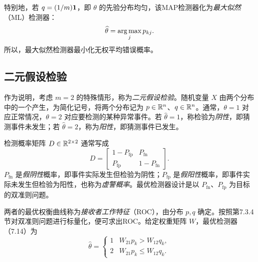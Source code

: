 特别地，若 $q=(1/m)\mathbf 1$，即 $\theta$ 的先验分布均匀，该MAP检测器化为\emph{最大似然}（ML）检测器：
\[
 \widehat\theta=\operatorname*{arg\,max}_jp_{kj}.
\]
所以，最大似然检测器最小化无权平均错误概率。

\subsection{二元假设检验}
作为说明，考虑 $m=2$ 的特殊情形，称为\emph{二元假设检验}。随机变量 $X$ 由两个分布中的一个产生，为简化记号，将两个分布记为 $p\in\mathbb R^n$、$q\in\mathbb R^n$。通常，$\theta=1$ 对应正常情况，$\theta=2$ 对应要检测的某种异常事件。若 $\widehat\theta=1$，称检验为\emph{阴性}，即猜测事件未发生；若 $\widehat\theta=2$，称为\emph{阳性}，即猜测事件已发生。

检测概率矩阵 $D\in\mathbb R^{2\times2}$ 通常写成
\[
 D=\begin{bmatrix}1-P_{\mathrm{fp}}&P_{\mathrm{fn}}\\
 P_{\mathrm{fp}}&1-P_{\mathrm{fn}}\end{bmatrix}.
\]
$P_{\mathrm{fn}}$ 是\emph{假阴性}概率，即事件实际发生但检验为阴性；$P_{\mathrm{fp}}$ 是\emph{假阳性}概率，即事件实际未发生但检验为阳性，也称为\emph{虚警概率}。最优检测器设计是以 $P_{\mathrm{fn}}$、$P_{\mathrm{fp}}$ 为目标的双准则问题。

两者的最优权衡曲线称为\emph{接收者工作特征}（ROC），由分布 $p,q$ 确定。按照第7.3.4节对双准则问题进行标量化，便可求出ROC。给定权重矩阵 $W$，最优检测器（7.14）为
\[
 \widehat\theta=\begin{cases}
 1&W_{21}p_k>W_{12}q_k,\\
 2&W_{21}p_k\le W_{12}q_k.
 \end{cases}
\]
